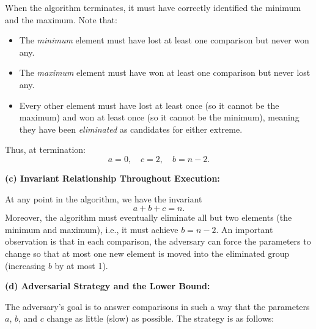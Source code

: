 \documentclass[11pt]{article}
\begin{document}
    When the algorithm terminates, it must have correctly identified the minimum and the maximum. Note that:
    \begin{itemize}
        \item The \emph{minimum} element must have lost at least one comparison but never won any.
        \item The \emph{maximum} element must have won at least one comparison but never lost any.
        \item Every other element must have lost at least once (so it cannot be the maximum) and won at least once (so it cannot be the minimum), meaning they have been \emph{eliminated} as candidates for either extreme.
    \end{itemize}
    Thus, at termination:
    \[
    a = 0,\quad c = 2,\quad b = n-2.
    \]
    
    \bigskip
    
    \textbf{(c) Invariant Relationship Throughout Execution:}
    
    At any point in the algorithm, we have the invariant
    \[
    a + b + c = n.
    \]
    Moreover, the algorithm must eventually eliminate all but two elements (the minimum and maximum), i.e., it must achieve \( b = n-2 \). An important observation is that in each comparison, the adversary can force the parameters to change so that at most one new element is moved into the eliminated group (increasing \( b \) by at most 1).
    
    \bigskip
    
    \textbf{(d) Adversarial Strategy and the Lower Bound:}
    
    The adversary’s goal is to answer comparisons in such a way that the parameters \( a \), \( b \), and \( c \) change as little (slow) as possible. The strategy is as follows:
    
\end{document}
